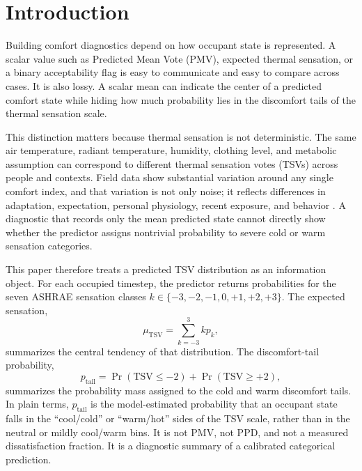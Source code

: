 \section{Introduction}\label{intro}

Building comfort diagnostics depend on how occupant state is represented. A scalar value such as Predicted Mean Vote (PMV), expected thermal sensation, or a binary acceptability flag is easy to communicate and easy to compare across cases. It is also lossy. A scalar mean can indicate the center of a predicted comfort state while hiding how much probability lies in the discomfort tails of the thermal sensation scale.

This distinction matters because thermal sensation is not deterministic. The same air temperature, radiant temperature, humidity, clothing level, and metabolic assumption can correspond to different thermal sensation votes (TSVs) across people and contexts. Field data show substantial variation around any single comfort index, and that variation is not only noise; it reflects differences in adaptation, expectation, personal physiology, recent exposure, and behavior \citep{deDear1998Adaptive,Brager2000Adaptive,Humphreys2002Adaptive,Foldvary2018GlobalDB}. A diagnostic that records only the mean predicted state cannot directly show whether the predictor assigns nontrivial probability to severe cold or warm sensation categories.

This paper therefore treats a predicted TSV distribution as an information object. For each occupied timestep, the predictor returns probabilities for the seven ASHRAE sensation classes $k\in\{-3,-2,-1,0,+1,+2,+3\}$. The expected sensation,
\begin{equation}
\mu_{\mathrm{TSV}}=\sum_{k=-3}^{3} k p_k,
\end{equation}
summarizes the central tendency of that distribution. The discomfort-tail probability,
\begin{equation}
p_{\mathrm{tail}}=\Pr(\mathrm{TSV}\le -2)+\Pr(\mathrm{TSV}\ge +2),
\end{equation}
summarizes the probability mass assigned to the cold and warm discomfort tails. In plain terms, $p_{\mathrm{tail}}$ is the model-estimated probability that an occupant state falls in the ``cool/cold'' or ``warm/hot'' sides of the TSV scale, rather than in the neutral or mildly cool/warm bins. It is not PMV, not PPD, and not a measured dissatisfaction fraction. It is a diagnostic summary of a calibrated categorical prediction.

